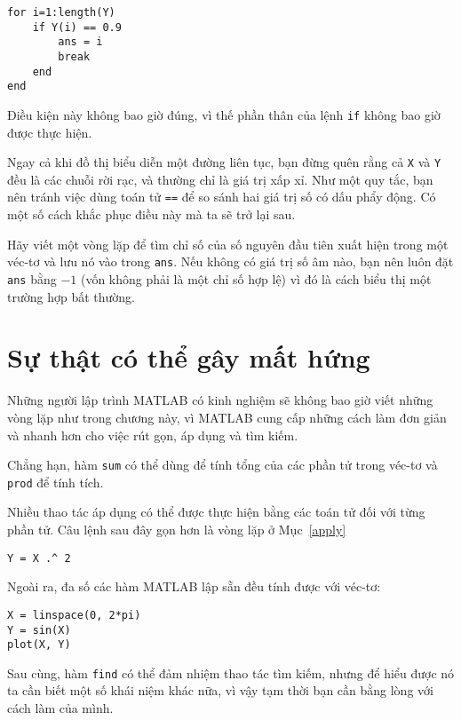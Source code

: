 \documentclass[12pt]{book}
\begin{document}
\begin{verbatim}
for i=1:length(Y)
    if Y(i) == 0.9
        ans = i
        break
    end
end
\end{verbatim}

Điều kiện này không bao giờ đúng, vì thế phần thân của lệnh {\tt if} 
không bao giờ được thực hiện.

Ngay cả khi đồ thị biểu diễn một đường liên tục, bạn đừng quên rằng
cả {\tt X} và {\tt Y} đều là các chuỗi rời rạc, và thường chỉ là 
giá trị xấp xỉ. Như một quy tắc, bạn nên tránh việc dùng toán tử 
{\tt ==} để so sánh hai giá trị số có dấu phẩy động. Có một số cách
khắc phục điều này mà ta sẽ trở lại sau.

\begin{ex}
Hãy viết một vòng lặp để tìm chỉ số của số nguyên đầu tiên xuất hiện
trong một véc-tơ và lưu nó vào trong {\tt ans}.  Nếu không có
giá trị số âm nào, bạn nên luôn đặt {\tt ans} bằng $-1$ (vốn
không phải là một chỉ số hợp lệ) vì đó là cách biểu thị một trường
hợp bất thường.
\end{ex}



\section{Sự thật có thể gây mất hứng}

Những người lập trình MATLAB có kinh nghiệm sẽ không bao giờ viết
những vòng lặp như trong chương này, vì MATLAB cung cấp những cách
làm đơn giản và nhanh hơn cho việc rút gọn, áp dụng và tìm kiếm.

Chẳng hạn, hàm {\tt sum} có thể dùng để tính tổng của các phần tử
trong véc-tơ và {\tt prod} để tính tích.

Nhiều thao tác áp dụng có thể được thực hiện bằng các toán tử đối
với từng phần tử. Câu lệnh sau đây gọn hơn là vòng lặp ở 
Mục~\ref{apply}

\begin{verbatim}
Y = X .^ 2
\end{verbatim}

Ngoài ra, đa số các hàm MATLAB lập sẵn đều tính được với véc-tơ:

\begin{verbatim}
X = linspace(0, 2*pi)
Y = sin(X)
plot(X, Y)
\end{verbatim}

Sau cùng, hàm {\tt find} có thể đảm nhiệm thao tác tìm kiếm, nhưng
để hiểu được nó ta cần biết một số khái niệm khác nữa, vì vậy tạm
thời bạn cần bằng lòng với cách làm của mình.
\end{document}
